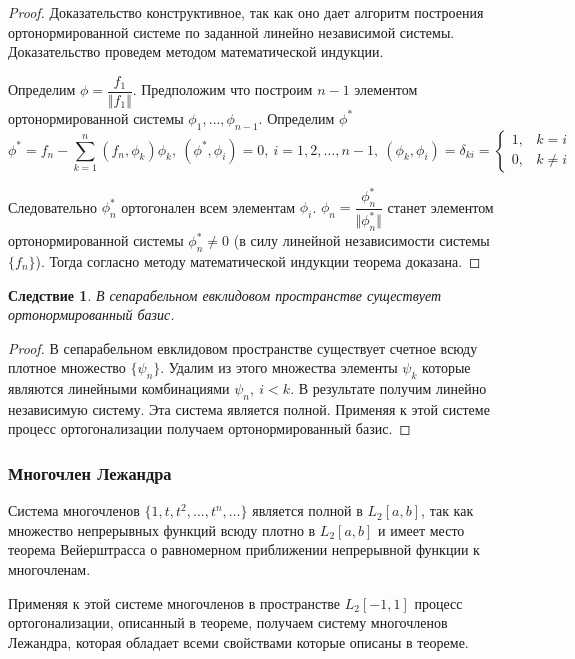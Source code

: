 \documentclass[14pt,a4paper]{extarticle}
\newtheorem{corollary}{Следствие}[theorem]
\theoremstyle{definition}
\theoremstyle{remark}
\renewcommand{\[}{\begin{dmath*}[compact]}
\renewcommand{\]}{\end{dmath*}}
\newcommand{\sep}{ , \ \allowbreak }
\newcommand\fr[2]{\dfrac{#1}{#2}}
\begin{document}
\begin{proof}
  Доказательство конструктивное, так как оно дает алгоритм построения
  ортонормированной системе по заданной линейно независимой системы.
  Доказательство проведем методом математической индукции.

  Определим $\phi = \fr{f_1}{\Vert f_1 \Vert}$.
  Предположим что построим $n-1$ элементом ортонормированной системы
  $\phi_1, \dots, \phi_{n-1}$. Определим $\phi^*$
  \[\phi^* = f_n - \sum_{k=1}^n (f_n,\phi_k) \phi_k \sep
  {(\phi^* , \phi_i) = 0} \sep {i=1,2,\dots, n-1} \sep
  (\phi_k, \phi_i) = \delta_{ki} \allowbreak
  = \begin{cases} 1, & k=i \\ 0, & k\neq i \end{cases}\]

  Следовательно $\phi_n^*$ ортогонален всем элементам $\phi_i$.
  $\phi_n = \fr{\phi_n^*}{\Vert \phi_n^* \Vert}$
  станет элементом ортонормированной системы $\phi_n^* \neq 0$
  (в силу линейной независимости системы $\{f_n\}$).
  Тогда согласно методу математической индукции теорема доказана.
\end{proof}

\begin{corollary}
В сепарабельном евклидовом пространстве существует ортонормированный базис.
\end{corollary}

\begin{proof}
В сепарабельном евклидовом пространстве существует счетное всюду
плотное множество $\{\psi_n\}$.
Удалим из этого множества элементы $\psi_k$ которые являются
линейными комбинациями $\psi_n \sep i<k$. В результате получим
линейно независимую систему.
Эта система является полной.
Применяя к этой системе процесс ортогонализации получаем
ортонормированный базис.
\end{proof}

\subsubsection{Многочлен Лежандра}

Система многочленов $\{1,t,t^2,\dots, t^n,\dots\}$ является полной
в $L_2[a,b]$,
так как множество непрерывных функций всюду плотно в $L_2[a,b]$ и имеет
место теорема Вейерштрасса о равномерном приближении непрерывной
функции к многочленам.

Применяя к этой системе многочленов в пространстве $L_2[-1,1]$ процесс
ортогонализации, описанный в теореме, получаем систему многочленов Лежандра,
которая обладает всеми свойствами которые описаны в теореме.
\end{document}
